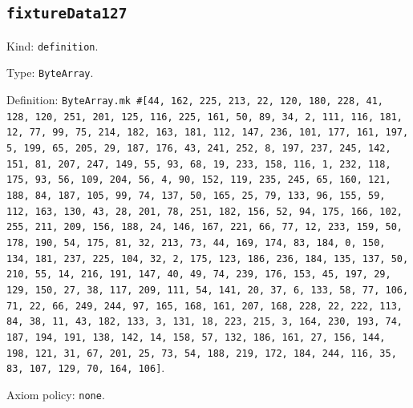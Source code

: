 \documentclass[11pt]{article}
\begin{document}
\subsection*{\texttt{fixtureData127}}
\noindent Kind: \texttt{definition}.\par
\noindent Type: \texttt{ByteArray}.\par
\noindent Definition: \texttt{ByteArray.mk \#[44, 162, 225, 213, 22, 120, 180, 228, 41, 128, 120, 251, 201, 125, 116, 225, 161, 50, 89, 34, 2, 111, 116, 181, 12, 77, 99, 75, 214, 182, 163, 181, 112, 147, 236, 101, 177, 161, 197, 5, 199, 65, 205, 29, 187, 176, 43, 241, 252, 8, 197, 237, 245, 142, 151, 81, 207, 247, 149, 55, 93, 68, 19, 233, 158, 116, 1, 232, 118, 175, 93, 56, 109, 204, 56, 4, 90, 152, 119, 235, 245, 65, 160, 121, 188, 84, 187, 105, 99, 74, 137, 50, 165, 25, 79, 133, 96, 155, 59, 112, 163, 130, 43, 28, 201, 78, 251, 182, 156, 52, 94, 175, 166, 102, 255, 211, 209, 156, 188, 24, 146, 167, 221, 66, 77, 12, 233, 159, 50, 178, 190, 54, 175, 81, 32, 213, 73, 44, 169, 174, 83, 184, 0, 150, 134, 181, 237, 225, 104, 32, 2, 175, 123, 186, 236, 184, 135, 137, 50, 210, 55, 14, 216, 191, 147, 40, 49, 74, 239, 176, 153, 45, 197, 29, 129, 150, 27, 38, 117, 209, 111, 54, 141, 20, 37, 6, 133, 58, 77, 106, 71, 22, 66, 249, 244, 97, 165, 168, 161, 207, 168, 228, 22, 222, 113, 84, 38, 11, 43, 182, 133, 3, 131, 18, 223, 215, 3, 164, 230, 193, 74, 187, 194, 191, 138, 142, 14, 158, 57, 132, 186, 161, 27, 156, 144, 198, 121, 31, 67, 201, 25, 73, 54, 188, 219, 172, 184, 244, 116, 35, 83, 107, 129, 70, 164, 106]}.\par
\noindent Axiom policy: \texttt{none}.\par
\end{document}
